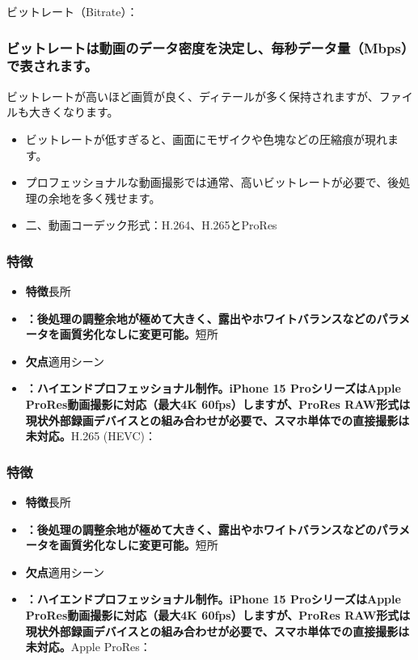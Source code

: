 ビットレート（Bitrate）：

\subsubsection*{ビットレートは動画のデータ密度を決定し、毎秒データ量（Mbps）で表されます。}

ビットレートが高いほど画質が良く、ディテールが多く保持されますが、ファイルも大きくなります。

\begin{itemize}
  \item ビットレートが低すぎると、画面にモザイクや色塊などの圧縮痕が現れます。
  \item プロフェッショナルな動画撮影では通常、高いビットレートが必要で、後処理の余地を多く残せます。
  \item 二、動画コーデック形式：H.264、H.265とProRes
\end{itemize}


\subsubsection*{特徴}

\begin{itemize}
  \item \textbf{特徴}長所
  \item \textbf{：後処理の調整余地が極めて大きく、露出やホワイトバランスなどのパラメータを画質劣化なしに変更可能。}短所
  \item \textbf{欠点}適用シーン
  \item \textbf{：ハイエンドプロフェッショナル制作。iPhone 15 ProシリーズはApple ProRes動画撮影に対応（最大4K 60fps）しますが、ProRes RAW形式は現状外部録画デバイスとの組み合わせが必要で、スマホ単体での直接撮影は未対応。}H.265 (HEVC)：
\end{itemize}

\subsubsection*{特徴}

\begin{itemize}
  \item \textbf{特徴}長所
  \item \textbf{：後処理の調整余地が極めて大きく、露出やホワイトバランスなどのパラメータを画質劣化なしに変更可能。}短所
  \item \textbf{欠点}適用シーン
  \item \textbf{：ハイエンドプロフェッショナル制作。iPhone 15 ProシリーズはApple ProRes動画撮影に対応（最大4K 60fps）しますが、ProRes RAW形式は現状外部録画デバイスとの組み合わせが必要で、スマホ単体での直接撮影は未対応。}Apple ProRes：
\end{itemize}

